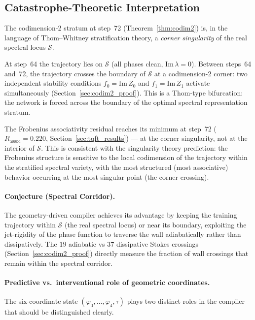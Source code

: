 \documentclass[11pt]{amsart}
\begin{document}
\subsection{Catastrophe-Theoretic Interpretation}

The codimension-2 stratum at step~72 (Theorem~\ref{thm:codim2}) is,
in the language of Thom--Whitney stratification theory, a
\emph{corner singularity} of the real spectral locus $\mathcal{S}$.

At step~64 the trajectory lies on $\mathcal{S}$ (all phases clean,
$\mathrm{Im}\,\lambda = 0$).
Between steps~64 and~72, the trajectory crosses the boundary of
$\mathcal{S}$ at a codimension-2 corner: two independent stability
conditions $f_0 = \mathrm{Im}\,Z_0$ and $f_1 = \mathrm{Im}\,Z_1$
activate simultaneously (Section~\ref{sec:codim2_proof}).
This is a Thom-type bifurcation: the network is forced across the
boundary of the optimal spectral representation stratum.

The Frobenius associativity residual reaches its minimum at step~72
($R_\mathrm{assoc} = 0.220$, Section~\ref{sec:tqft_results})
--- at the corner singularity, not at the interior of $\mathcal{S}$.
This is consistent with the singularity theory prediction:
the Frobenius structure is sensitive to the local codimension of the
trajectory within the stratified spectral variety, with the most
structured (most associative) behavior occurring at the most singular
point (the corner crossing).

\paragraph{Conjecture (Spectral Corridor).}
The geometry-driven compiler achieves its advantage by keeping the
training trajectory within $\mathcal{S}$ (the real spectral locus)
or near its boundary, exploiting the jet-rigidity of the phase function
to traverse the wall adiabatically rather than dissipatively.
The $19$ adiabatic vs $37$ dissipative Stokes crossings
(Section~\ref{sec:codim2_proof}) directly measure
the fraction of wall crossings that remain within the spectral corridor.

\paragraph{Predictive vs.\ interventional role of geometric coordinates.}
The six-coordinate state $(\varphi_0,\ldots,\varphi_4,\tau)$ plays two
distinct roles in the compiler that should be distinguished clearly.
\end{document}
